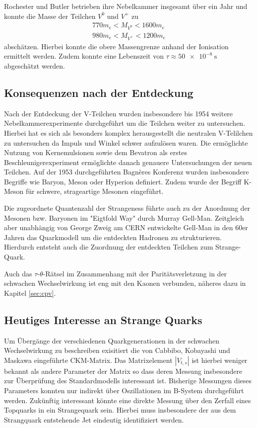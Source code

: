 Rochester und Butler betrieben ihre Nebelkammer insgesamt über ein Jahr und konnte die Masse der Teilchen $V^0$ und $V^+$ zu
\begin{align*}
	770 m_e < M_{V^0} < 1600 m_e \\
	980 m_e < M_{V^+} < 1200 m_e
\end{align*}
abschätzen.
Hierbei konnte die obere Massengrenze anhand der Ionisation ermittelt werden.
Zudem konnte eine Lebenszeit von $\tau \approx \SI{50e-8}{\second}$ abgeschätzt werden.

\subsection{Konsequenzen nach der Entdeckung}
 
 Nach der Entdeckung der V-Teilchen wurden insbesondere bis 1954 weitere Nebelkammerexperimente durchgeführt um die Teilchen weiter zu untersuchen.
 Hierbei hat es sich als besonders komplex herausgestellt die neutralen V-Telilchen zu untersuchen da Impuls und Winkel schwer aufzulösen waren.
 Die ermöglichte Nutzung von Kernemulsionen sowie dem Bevatron als erstes Beschleunigerexperiment ermöglichte danach genauere Untersuchungen der neuen Teilchen.
 Auf der 1953 durchgeführten Bagnères Konferenz wurden insbesondere Begriffe wie Baryon, Meson oder Hyperion definiert.
 Zudem wurde der Begriff K-Meson für schwere, strageartige Mesonen eingeführt.

 Die zugeordnete Quantenzahl der Strangeness führte auch zu der Anordnung der Mesonen bzw. Baryonen im "Eigtfold Way" durch Murray Gell-Man.
 Zeitgleich aber unabhängig von George Zweig am CERN entwickelte Gell-Man in den 60er Jahren das Quarkmodell um die entdeckten Hadronen zu strukturieren.
 Hierdurch entsteht auch die Zuordnung der entdeckten Teilchen zum Strange-Quark.

 Auch das $\tau$-$\theta$-Rätsel im Zusammenhang mit der Paritätsverletzung in der schwachen Wechselwirkung ist eng mit den Kaonen verbunden, näheres dazu in Kapitel \ref{sec:cpv}.

\subsection{Heutiges Interesse an Strange Quarks}
Um Übergänge der verschiedenen Quarkgenerationen in der schwachen Wechselwirkung zu beschreiben exisitiert die von Cabbibo, Kobayashi und Maskawa eingeführte CKM-Matrix.
Das Matrixelement $|V_{t,s}|$ ist hierbei weniger bekannt als andere Parameter der Matrix so dass deren Messung insbesondere zur Überprüfung des Standardmodells interessant ist.
Bisherige Messungen dieses Parameters konnten nur indirekt über Oszillationen im B-System durchgeführt werden.
Zukünftig interessant könnte eine direkte Messung über den Zerfall eines Topquarks in ein Strangequark sein.
Hierbei muss insbesondere der aus dem Strangquark entstehende Jet eindeutig identifiziert werden.
